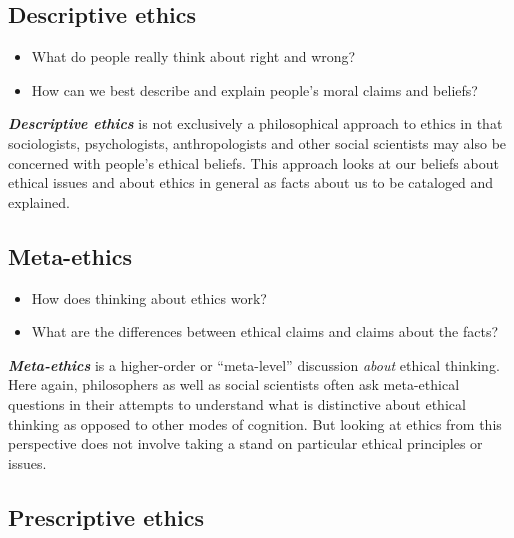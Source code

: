\documentclass[12pt, openany]{book}
\makeatletter
\providecommand{\tightlist}{%
  \setlength{\itemsep}{0pt}\setlength{\parskip}{0pt}}
\newenvironment{kframe}{%
\medskip{}
\setlength{\fboxsep}{.8em}
 \def\at@end@of@kframe{}%
 \ifinner\ifhmode%
  \def\at@end@of@kframe{\end{minipage}}%
  \begin{minipage}{\columnwidth}%
 \fi\fi%
 \def\FrameCommand##1{\hskip\@totalleftmargin \hskip-\fboxsep
 \colorbox{shadecolor}{##1}\hskip-\fboxsep
     \hskip-\linewidth \hskip-\@totalleftmargin \hskip\columnwidth}%
 \MakeFramed {\advance\hsize-\width
   \@totalleftmargin\z@ \linewidth\hsize
   \@setminipage}}%
 {\par\unskip\endMakeFramed%
 \at@end@of@kframe}
\newenvironment{rmdblock}[1]
  {
  \begin{itemize}
  \renewcommand{\labelitemi}{
    \raisebox{-.7\height}[0pt][0pt]{
      {\setkeys{Gin}{width=3em,keepaspectratio}\texttt{[image: img/\#1]}}
    }
  }
  \setlength{\fboxsep}{1em}
  \begin{kframe}
  \item
  }
  {
  \end{kframe}
  \end{itemize}
  }
\newenvironment{question}
  {\begin{rmdblock}{question}}
  {\end{rmdblock}}
\makeatother
\begin{document}
\hypertarget{descriptive-ethics}{%
\subsection*{Descriptive ethics}\label{descriptive-ethics}}


\begin{question}

\begin{itemize}
\tightlist
\item
  What do people really think about right and wrong?
\item
  How can we best describe and explain people's moral claims and beliefs?
\end{itemize}

\end{question}

\textbf{\emph{Descriptive ethics}} is not exclusively a philosophical approach to ethics in that sociologists, psychologists, anthropologists and other social scientists may also be concerned with people's ethical beliefs. This approach looks at our beliefs about ethical issues and about ethics in general as facts about us to be cataloged and explained.

\hypertarget{meta-ethics}{%
\subsection*{Meta-ethics}\label{meta-ethics}}


\begin{question}

\begin{itemize}
\tightlist
\item
  How does thinking about ethics work?
\item
  What are the differences between ethical claims and claims about the facts?
\end{itemize}

\end{question}

\textbf{\emph{Meta-ethics}} is a higher-order or ``meta-level'' discussion \emph{about} ethical thinking. Here again, philosophers as well as social scientists often ask meta-ethical questions in their attempts to understand what is distinctive about ethical thinking as opposed to other modes of cognition. But looking at ethics from this perspective does not involve taking a stand on particular ethical principles or issues.

\hypertarget{prescriptive-ethics}{%
\subsection*{Prescriptive ethics}\label{prescriptive-ethics}}
\end{document}
